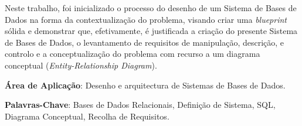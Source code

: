 \documentclass[a4paper,12pt]{scrreprt}
\begin{document}


\makecover



    
    






\renewenvironment{abstract}
 {\par\noindent\textbf{\Large\abstractname}\par\bigskip}
 {}

\begin{flushleft}
\begin{abstract}
    Neste trabalho, foi inicializado o processo do desenho de um Sistema de
    Bases de Dados na forma da contextualiza\c{c}\~ao do problema, visando
    criar uma \textit{blueprint} s\'olida e demonstrar que, efetivamente,
    \'e justificada a cria\c{c}\~ao do presente Sistema de Bases de Dados,
    o levantamento de requisitos de manipulação, descrição, e controlo e a
    conceptualização do problema com recurso a um diagrama conceptual
    (\textit{Entity-Relationship Diagram}).
    \par \textbf{\'Area de Aplicação}: Desenho e arquitectura de Sistemas de
    Bases de Dados.
    \par \textbf{Palavras-Chave}: Bases de Dados Relacionais,
    Defini\c{c}\~ao de Sistema, SQL, Diagrama Conceptual,
    Recolha de Requisitos.
\end{abstract}
\end{flushleft}
\end{document}
